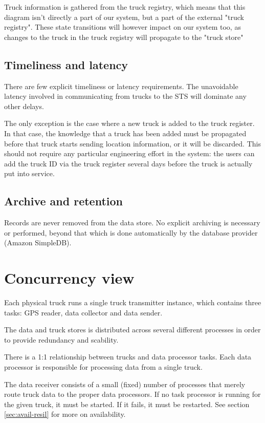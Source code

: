 \documentclass[a4paper,11pt]{report}
\begin{document}
Truck information is gathered from the truck registry, which means that this diagram isn't directly a part of our system, but a part of the external "truck registry". These state transitions will however impact on our system too, as changes to the truck in the truck registry will propagate to the "truck store" 

\subsection{Timeliness and latency}
\label{sec:timeliness-latency}


There are few explicit timeliness or latency requirements.  The
unavoidable latency involved in communicating from trucks to the STS
will dominate any other delays.

The only exception is the case where a new truck is added to the truck
register.  In that case, the knowledge that a truck has been added
must be propagated before that truck starts sending location
information, or it will be discarded.  This should not require any
particular engineering effort in the system: the users can add the
truck ID via the truck register several days before the truck is
actually put into service.

\subsection{Archive and retention}
\label{sec:archive-retention}

Records are never removed from the data store.  No explicit archiving
is necessary or performed, beyond that which is done automatically by
the database provider (Amazon SimpleDB).

\section{Concurrency view}
\label{sec:concurrency-view}


Each physical truck runs a single truck transmitter instance, which
contains three tasks: GPS reader, data collector and data sender.

The data and truck stores is distributed across several different
processes in order to provide redundancy and scability.

There is a 1:1 relationship between trucks and data processor tasks.
Each data processor is responsible for processing data from a single
truck.

The data receiver consists of a small (fixed) number of processes that
merely route truck data to the proper data processors.  If no task
processor is running for the given truck, it must be started.  If it
fails, it must be restarted.  See section \ref{sec:avail-resil} for
more on availability.
\end{document}
